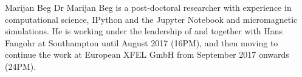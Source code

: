 \begin{participant}[type=R, PM=16,gender=male]{Marijan Beg}
  Dr Marijan Beg is a post-doctoral researcher with experience in
  computational science, IPython and the Jupyter Notebook and micromagnetic
  simulations. He is working under the leadership of and together with Hans
  Fangohr at Southampton until August 2017 (16PM), and then moving to
  continue the work at European XFEL GmbH from September 2017 onwards (24PM).
\end{participant}
